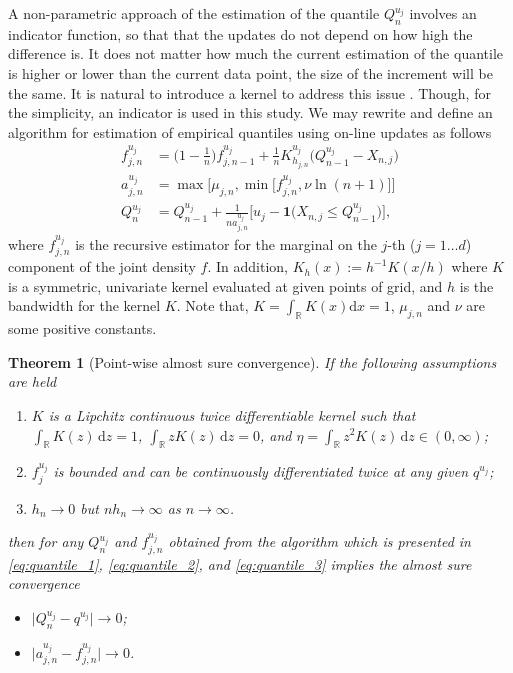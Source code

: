 \documentclass[12pt]{article}
\newtheorem{theorem}{Theorem}
\begin{document}
	A non-parametric approach of the estimation of the quantile $ Q^{u_j}_n $ involves an indicator function, so that that the updates do not depend on how high the difference is. It does not matter how much the current estimation of the quantile is higher or lower than the current data point, the size of the increment will be the same. It is natural to introduce a kernel to address this issue \parencite{Amiri2014}. Though, for the simplicity, an indicator is used in this study.  We may rewrite and define an algorithm for estimation of empirical quantiles using on-line updates as follows
	\begin{align}
		f^{u_j}_{j, n} &= \bigg(1- \frac{1}{n}\bigg) f^{u_j}_{j, n-1} + \frac{1}{n} K^{u_j}_{h_{j, n}}\big(Q^{u_j}_{n-1} - X_{n, j}\big) \label{eq:quantile_1} \\
		a^{u_j}_{j, n} &= \max\Big[\mu_{j, n}, \min\big[f^{u_j}_{j, n}, \nu \ln(n+1)\big]\Big] \label{eq:quantile_2} \\
		Q^{u_j}_n &= Q^{u_j}_{n-1} + \frac{1}{n a^{u_j}_{j, n}}\Bigg[u_j - \mathbf{1}\big(X_{n, j}\leq Q^{u_j}_{n-1}\big)\Bigg], \label{eq:quantile_3}
	\end{align}
	where $ f^{u_j}_{j, n} $ is the recursive estimator for the marginal on the $ j $-th ($ j=1\dots d $) component of the joint density $ f $. In addition, $ K_h(x) := h^{-1}K(x/h) $ where $ K $ is a symmetric, univariate kernel evaluated at given points of grid, and $ h $ is the bandwidth for the kernel $ K $. Note that, $ K = \int_{\mathbb{R}}K(x)\text{d}x=1 $, $ \mu_{j, n} $ and $ \nu $ are some positive constants.
	
	\begin{theorem}[Point-wise almost sure convergence]\label{thm:almost_sure_convergence}
		If the following assumptions are held
		\begin{enumerate}
			\item $ K $ is a Lipchitz continuous twice differentiable kernel such that $ \int_\mathbb{R} K(z)\, \text{d}z = 1 $, $ \int_\mathbb{R} zK(z)\, \text{d}z = 0 $, and $\eta = \int_\mathbb{R} z^2K(z)\, \text{d}z \in (0, \infty) $;
			\item $ f^{u_j}_j $ is bounded and can be continuously differentiated twice at any given $ q^{u_j} $;
			\item $ h_n \rightarrow 0 $ but $ nh_n \rightarrow \infty $ as $ n\rightarrow \infty $.
		\end{enumerate}
		then for any $ Q^{u_j}_n $ and $ f^{u_j}_{j, n} $ obtained from the algorithm which is presented in \eqref{eq:quantile_1}, \eqref{eq:quantile_2}, and \eqref{eq:quantile_3} implies the almost sure convergence
		\begin{itemize}
			\item[a. ] $ \big|Q^{u_j}_n - q^{u_j}\big| \rightarrow 0 $;
			\item[b. ] $ \big|a^{u_j}_{j, n} - f^{u_j}_{j, n}\big| \rightarrow 0 $.
		\end{itemize}
	\end{theorem}
	
\end{document}
